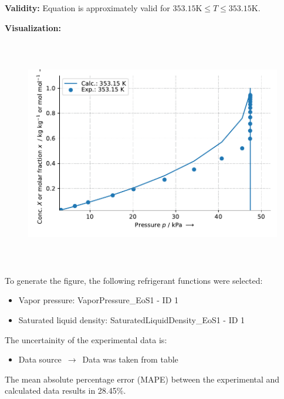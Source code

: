 \textbf{Validity:}
\newline
Equation is approximately valid for $353.15 \si{\kelvin} \leq T \leq 353.15 \si{\kelvin}$.
\newline

\textbf{Visualization:}
%
\begin{figure}[!htp]
{\noindent\includegraphics[height=10cm, keepaspectratio]{figs/abs/abs_Water_ionic_liquid_[EMIM]+[(CF3SO2)2N]-_WilsonFixedDl_1.pdf}}
\end{figure}
%

To generate the figure, the following refrigerant functions were selected:
\begin{itemize}
\item Vapor pressure: VaporPressure\_EoS1 - ID 1
\item Saturated liquid density: SaturatedLiquidDensity\_EoS1 - ID 1
\end{itemize}

The uncertainity of the experimental data is:
\begin{itemize}
\item Data source $\,\to\,$ Data was taken from table
\end{itemize}

The mean absolute percentage error (MAPE) between the experimental and calculated data results in 28.45\%.
\FloatBarrier
\newpage
